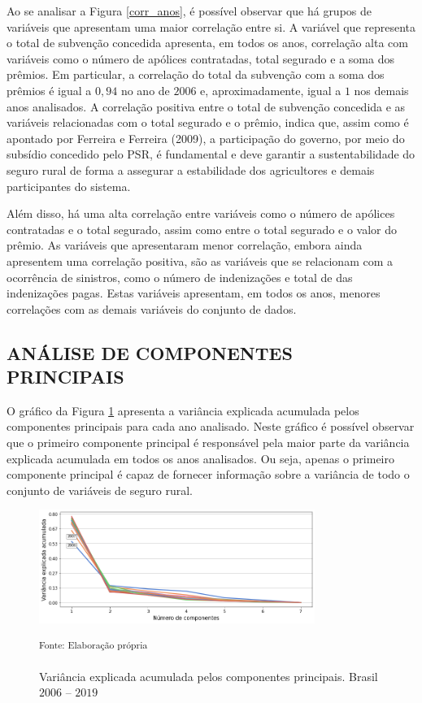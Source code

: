 Ao se analisar a Figura \ref{corr_anos}, é possível observar que há grupos de variáveis que apresentam uma maior correlação entre si. A variável que representa o total de subvenção concedida apresenta, em todos os anos, correlação alta com variáveis como o número de apólices contratadas, total segurado e a soma dos prêmios. Em particular, a correlação do total da subvenção com a soma dos prêmios é igual a $0,94$ no ano de $2006$ e, aproximadamente, igual a $1$ nos demais anos analisados. A correlação positiva entre o total de subvenção concedida e as variáveis relacionadas com o total segurado e o prêmio, indica que, assim como é apontado por Ferreira e Ferreira (2009), a participação do governo, por meio do subsídio concedido pelo PSR, é fundamental e deve garantir a sustentabilidade do seguro rural de forma a assegurar a estabilidade dos agricultores e demais participantes do sistema. 

Além disso, há uma alta correlação entre variáveis como o número de apólices contratadas e o total segurado, assim como entre o total segurado e o valor do prêmio. As variáveis que apresentaram menor correlação, embora ainda apresentem uma correlação positiva, são as variáveis que se relacionam com a ocorrência de sinistros, como o número de indenizações e total de das indenizações pagas. Estas variáveis apresentam, em todos os anos, menores correlações com as demais variáveis do conjunto de dados. 

\subsection{ANÁLISE DE COMPONENTES PRINCIPAIS} 

O gráfico da Figura \ref{var_ratio} apresenta a variância explicada acumulada pelos componentes principais para cada ano analisado. Neste gráfico é possível observar que o primeiro componente principal é responsável pela maior parte da variância explicada acumulada em todos os anos analisados. Ou seja, apenas o primeiro componente principal é capaz de fornecer informação sobre a variância de todo o conjunto de variáveis de seguro rural. 

\begin{figure}[H]
	\centering
	\caption{Variância explicada acumulada pelos componentes principais. Brasil $2006$ -- $2019$}
	\includegraphics[width=0.8\textwidth]{figuras/var_radio.png}	\parbox{\dimexpr\linewidth-2cm}{\raggedright
    \strut \textsuperscript{Fonte: Elaboração própria}\strut}
    \label{var_ratio}
\end{figure}

